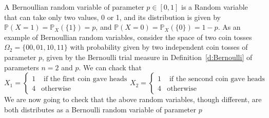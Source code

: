 	\begin{example}
		\label{ex:Bernoulli}
		A  Bernoullian random variable of parameter $p\in [0,1]$ is a Random variable that can take only two values, 0 or 1, and its distribution is given by $\mathbb P(X = 1 ) = \mathbb P_X(\{1\}) = p$, and $\mathbb P(X = 0 ) = \mathbb P_X  (\{0\}) = 1-p$. As an example of Bernoullian random variables, consider the space of two coin tosses $\Omega_2 = \{ 00,01,10,11\}$ with probability given by two independent coin tosses of parameter $p$, given by the Bernoulli trial measure in Definition~\ref{d:Bernoulli} of parameters $n = 2$ and $p $. We can chack that 
			\begin{equation}
				\label{e:BernoulliCoins}
				X_1 = \begin{cases}
					1 & \text{ if the first coin gave heads}\\
					4 & \text{otherwise}
					\end{cases}
				X_2 = \begin{cases}
					1 & \text{ if the sencond coin gave heads}\\
					4 & \text{otherwise}
					\end{cases}
	\end{equation}
	We are now going to check that the above random variables, though different, are both distributes as a Bernoulli random variable of parameter $p$
	\end{example}
	
